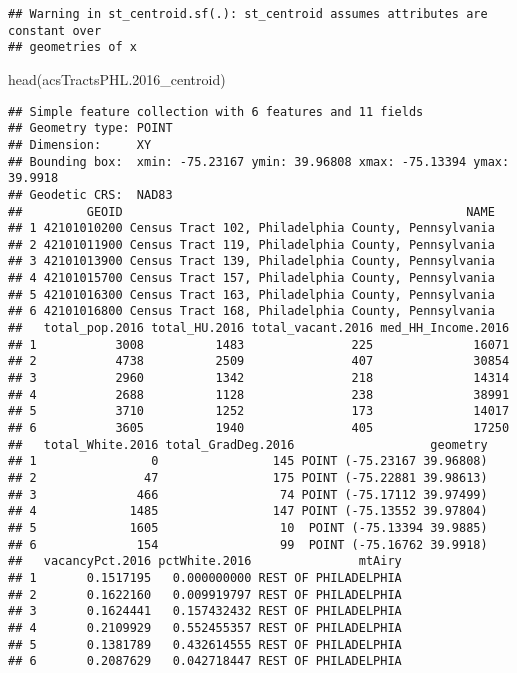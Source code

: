 \documentclass[
]{article}
\newenvironment{Shaded}{\begin{snugshade}}{\end{snugshade}}
\newcommand{\FloatTok}[1]{\textcolor[rgb]{0.00,0.00,0.81}{#1}}
\newcommand{\FunctionTok}[1]{\textcolor[rgb]{0.00,0.00,0.00}{#1}}
\newcommand{\NormalTok}[1]{#1}
\begin{document}
\begin{verbatim}
## Warning in st_centroid.sf(.): st_centroid assumes attributes are constant over
## geometries of x
\end{verbatim}

\begin{Shaded}
\begin{Highlighting}[]
\FunctionTok{head}\NormalTok{(acsTractsPHL}\FloatTok{.2016}\NormalTok{\_centroid)}
\end{Highlighting}
\end{Shaded}

\begin{verbatim}
## Simple feature collection with 6 features and 11 fields
## Geometry type: POINT
## Dimension:     XY
## Bounding box:  xmin: -75.23167 ymin: 39.96808 xmax: -75.13394 ymax: 39.9918
## Geodetic CRS:  NAD83
##         GEOID                                                NAME
## 1 42101010200 Census Tract 102, Philadelphia County, Pennsylvania
## 2 42101011900 Census Tract 119, Philadelphia County, Pennsylvania
## 3 42101013900 Census Tract 139, Philadelphia County, Pennsylvania
## 4 42101015700 Census Tract 157, Philadelphia County, Pennsylvania
## 5 42101016300 Census Tract 163, Philadelphia County, Pennsylvania
## 6 42101016800 Census Tract 168, Philadelphia County, Pennsylvania
##   total_pop.2016 total_HU.2016 total_vacant.2016 med_HH_Income.2016
## 1           3008          1483               225              16071
## 2           4738          2509               407              30854
## 3           2960          1342               218              14314
## 4           2688          1128               238              38991
## 5           3710          1252               173              14017
## 6           3605          1940               405              17250
##   total_White.2016 total_GradDeg.2016                   geometry
## 1                0                145 POINT (-75.23167 39.96808)
## 2               47                175 POINT (-75.22881 39.98613)
## 3              466                 74 POINT (-75.17112 39.97499)
## 4             1485                147 POINT (-75.13552 39.97804)
## 5             1605                 10  POINT (-75.13394 39.9885)
## 6              154                 99  POINT (-75.16762 39.9918)
##   vacancyPct.2016 pctWhite.2016               mtAiry
## 1       0.1517195   0.000000000 REST OF PHILADELPHIA
## 2       0.1622160   0.009919797 REST OF PHILADELPHIA
## 3       0.1624441   0.157432432 REST OF PHILADELPHIA
## 4       0.2109929   0.552455357 REST OF PHILADELPHIA
## 5       0.1381789   0.432614555 REST OF PHILADELPHIA
## 6       0.2087629   0.042718447 REST OF PHILADELPHIA
\end{verbatim}
\end{document}
